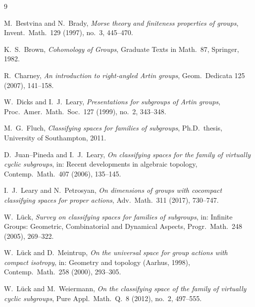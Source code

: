 \documentclass{amsart}
\theoremstyle{definition}
\begin{document}
\begin{thebibliography}{9}

 M.~Bestvina and N.~Brady,
\emph{Morse theory and finiteness properties of groups},
Invent.\ Math.\ 129 (1997), no.~3, 445--470.

 K.~S.~Brown, \emph{Cohomology of Groups}, Graduate Texts in Math.\ 87,
Springer, 1982.

 R.~Charney, \emph{An introduction to right-angled Artin groups},
Geom.\ Dedicata 125 (2007), 141--158.

 W.~Dicks and I.~J.~Leary,
\emph{Presentations for subgroups of Artin groups},
Proc.\ Amer.\ Math.\ Soc.\ 127 (1999), no.~2, 343--348.

 M.~G.~Fluch, \emph{Classifying spaces for families of subgroups},
Ph.D.\ thesis, University of Southampton, 2011.

 D.~Juan--Pineda and I.~J.~Leary,
\emph{On classifying spaces for the family of virtually cyclic subgroups},
in: Recent developments in algebraic topology, Contemp.\ Math.\ 407 (2006), 135--145.

 I.~J.~Leary and N.~Petrosyan,
\emph{On dimensions of groups with cocompact classifying spaces for proper actions},
Adv.\ Math.\ 311 (2017), 730--747.

 W.~Lück,
\emph{Survey on classifying spaces for families of subgroups},
in: Infinite Groups: Geometric, Combinatorial and Dynamical Aspects,
Progr.\ Math.\ 248 (2005), 269--322.

 W.~Lück and D.~Meintrup,
\emph{On the universal space for group actions with compact isotropy},
in: Geometry and topology (Aarhus, 1998), Contemp.\ Math.\ 258 (2000), 293--305.

 W.~Lück and M.~Weiermann,
\emph{On the classifying space of the family of virtually cyclic subgroups},
Pure Appl.\ Math.\ Q.\ 8 (2012), no.~2, 497--555.

\end{thebibliography}
\end{document}
